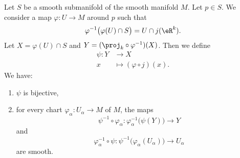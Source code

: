 \begin{lemma}		\label{LEMooMGIZooIzoLNR}
	Let \( S\) be a smooth submanifold of the smooth manifold \( M\). Let \( p\in S\). We consider a map \( \varphi\colon U\to M\) around \( p\) such that
	\begin{equation}
		\varphi^{-1}\big( \varphi(U)\cap S \big)=U\cap j(\eR^k).
	\end{equation}
	Let \( X=\varphi(U)\cap S\) and \( Y=(\proj_k\circ\varphi^{-1})(X)\). Then we define
	\begin{equation}
		\begin{aligned}
			\psi\colon Y & \to X                        \\
			x            & \mapsto (\varphi\circ j)(x).
		\end{aligned}
	\end{equation}
	We have:
	\begin{enumerate}
		\item
		      \( \psi\) is bijective,
		\item
		      for every chart \( \varphi_{\alpha}\colon U_{\alpha}\to M\) of \( M\), the maps
		      \begin{equation}        \label{EQooBAGFooDnpctJ}
			      \psi^{-1}\circ\varphi_{\alpha}\colon \varphi_{\alpha}^{-1}\big( \psi(Y) \big)\to Y
		      \end{equation}
		      and
		      \begin{equation}        \label{EQooKQIUooDCCczD}
			      \varphi_{\alpha}^{-1}\circ\psi\colon \psi^{-1}\big( \varphi_{\alpha}(U_{\alpha}) \big)\to U_{\alpha}
		      \end{equation}
		      are smooth.
	\end{enumerate}
\end{lemma}

